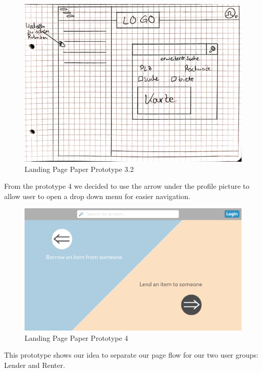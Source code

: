 			
			\begin{figure}[H]
				\centering
				\includegraphics[width=0.9\linewidth]{abb/6_Sketching and Paper Prototyping/Homepage4.png}
				\caption{Landing Page Paper Prototype 3.2}
				\label{fig:Homepage4}
			\end{figure}
			
			\noindent
			From the prototype 4 we decided to use the arrow under the profile picture to allow user to open a drop down menu for easier navigation.
			
			\begin{figure}[H]
				\centering
				\includegraphics[width=\linewidth]{abb/6_Sketching and Paper Prototyping/Homepage5.png}
				\caption{Landing Page Paper Prototype 4}
				\label{fig:Homepage4}
			\end{figure}
			
			\noindent
			This prototype shows our idea to separate our page flow for our two user groups: Lender and Renter.
			